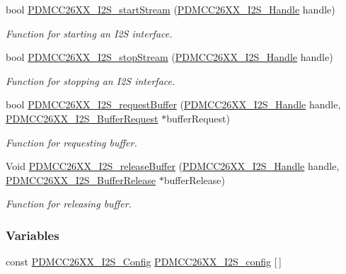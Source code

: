 \begin{DoxyCompactItemize}
bool \hyperlink{_p_d_m_c_c26_x_x__util_8h_ac318829ebbf5e66a0ee0c23ba3b36ba4}{P\+D\+M\+C\+C26\+X\+X\+\_\+\+I2\+S\+\_\+start\+Stream} (\hyperlink{_p_d_m_c_c26_x_x__util_8h_adc3b274b4a54e54316ad385fd4290c80}{P\+D\+M\+C\+C26\+X\+X\+\_\+\+I2\+S\+\_\+\+Handle} handle)
\begin{DoxyCompactList}\small\item\em Function for starting an I2\+S interface. \end{DoxyCompactList}\item 
bool \hyperlink{_p_d_m_c_c26_x_x__util_8h_abe6c63029970621defb60aaa467d9b6c}{P\+D\+M\+C\+C26\+X\+X\+\_\+\+I2\+S\+\_\+stop\+Stream} (\hyperlink{_p_d_m_c_c26_x_x__util_8h_adc3b274b4a54e54316ad385fd4290c80}{P\+D\+M\+C\+C26\+X\+X\+\_\+\+I2\+S\+\_\+\+Handle} handle)
\begin{DoxyCompactList}\small\item\em Function for stopping an I2\+S interface. \end{DoxyCompactList}\item 
bool \hyperlink{_p_d_m_c_c26_x_x__util_8h_a69561b9a6f07a82bfe3b18f3c51fcd19}{P\+D\+M\+C\+C26\+X\+X\+\_\+\+I2\+S\+\_\+request\+Buffer} (\hyperlink{_p_d_m_c_c26_x_x__util_8h_adc3b274b4a54e54316ad385fd4290c80}{P\+D\+M\+C\+C26\+X\+X\+\_\+\+I2\+S\+\_\+\+Handle} handle, \hyperlink{struct_p_d_m_c_c26_x_x___i2_s___buffer_request}{P\+D\+M\+C\+C26\+X\+X\+\_\+\+I2\+S\+\_\+\+Buffer\+Request} $\ast$buffer\+Request)
\begin{DoxyCompactList}\small\item\em Function for requesting buffer. \end{DoxyCompactList}\item 
Void \hyperlink{_p_d_m_c_c26_x_x__util_8h_ae6436840c3944258d3bdf041250dd10c}{P\+D\+M\+C\+C26\+X\+X\+\_\+\+I2\+S\+\_\+release\+Buffer} (\hyperlink{_p_d_m_c_c26_x_x__util_8h_adc3b274b4a54e54316ad385fd4290c80}{P\+D\+M\+C\+C26\+X\+X\+\_\+\+I2\+S\+\_\+\+Handle} handle, \hyperlink{struct_p_d_m_c_c26_x_x___i2_s___buffer_release}{P\+D\+M\+C\+C26\+X\+X\+\_\+\+I2\+S\+\_\+\+Buffer\+Release} $\ast$buffer\+Release)
\begin{DoxyCompactList}\small\item\em Function for releasing buffer. \end{DoxyCompactList}\end{DoxyCompactItemize}
\subsubsection*{Variables}
\begin{DoxyCompactItemize}
\item 
const \hyperlink{struct_p_d_m_c_c26_x_x___i2_s___config}{P\+D\+M\+C\+C26\+X\+X\+\_\+\+I2\+S\+\_\+\+Config} \hyperlink{_p_d_m_c_c26_x_x__util_8h_a1a4dd4e230736baa3d1c7c62528e918c}{P\+D\+M\+C\+C26\+X\+X\+\_\+\+I2\+S\+\_\+config} \mbox{[}$\,$\mbox{]}
\end{DoxyCompactItemize}


